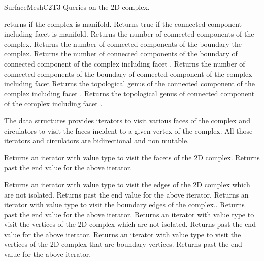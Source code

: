 \begin{ccRefConcept}{SurfaceMeshC2T3}
Queries on the 2D complex. 

{returns  if the complex is manifold.}
\ccGlue
{}
{Returns true if the   
connected component including  facet  is manifold.}
\ccGlue
{}
{Returns the number of connected components of the
complex.}
\ccGlue
{}
{Returns the number of connected components of the boundary
  the complex.}
\ccGlue
{}
{Returns the number of connected components of the boundary
of connected component of the complex including facet .}
\ccGlue
{}
{Returns the number of connected components of the boundary
of connected component of the complex including facet
}
\ccGlue
{}
{Returns the topological genus 
of the connected component of the complex including facet .}
\ccGlue
{}
{Returns the topological genus 
of connected component of the complex including facet .}






The data structures provides iterators  to visit  
various faces of the complex and circulators to visit the faces
incident to a given vertex of the complex.
All those iterators and circulators are bidirectional and
non mutable.

{Returns an iterator with value type  to visit the facets
of the 2D complex.}
\ccGlue
{}
{Returns past the end value for the above iterator.}

{Returns an iterator with value type  to visit the
edges of the 2D complex which are not isolated.}
\ccGlue
{}
{Returns past the end value for the above iterator.}
\ccGlue
{}
{Returns an iterator with value type  to visit the
boundary  edges of the complex..}
\ccGlue
{}
{Returns past the end value for the above iterator.}
\ccGlue
{}
{Returns an iterator with value type  to visit the
vertices of the 2D complex which are not isolated.}
\ccGlue
{}
{Returns past the end value for the above iterator.}
\ccGlue
{}
{Returns an iterator with value type  to visit the 
vertices of the 2D complex that are  boundary vertices.}
\ccGlue
{}
{Returns past the end value for the above iterator.}



\end{ccRefConcept}
